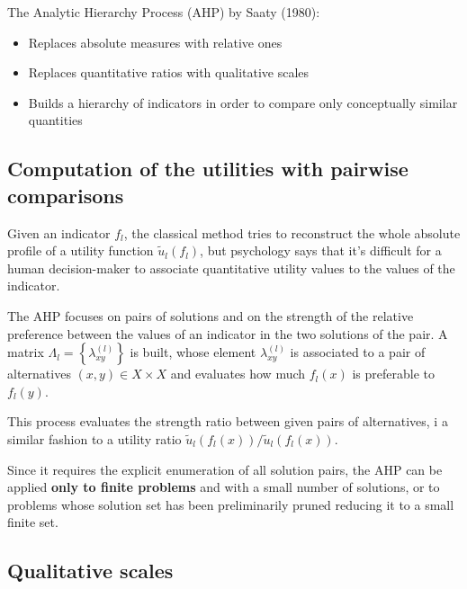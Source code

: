 The Analytic Hierarchy Process (AHP) by Saaty (1980): 
\begin{itemize}
	\item Replaces absolute measures with relative ones
	
	\item Replaces quantitative ratios with qualitative scales 
	
	\item Builds a hierarchy of indicators in order to compare only conceptually similar quantities
\end{itemize}

\subsection{Computation of the utilities with pairwise comparisons}

Given an indicator $f_l$, the classical method tries to reconstruct the whole absolute profile of a utility function $\tilde u_l (f_l)$, but psychology says that it's difficult for a human decision-maker to associate quantitative utility values to the values of the indicator.

The AHP focuses on pairs of solutions and on the strength of the relative preference between the values of an indicator in the two solutions of the pair. A matrix $\Lambda_l = \left\{\lambda_{xy}^{(l)}\right\}$ is built, whose element $\lambda_{xy}^{(l)}$ is associated to a pair of alternatives $(x,y) \in X \times X$ and evaluates how much $f_l (x)$ is preferable to $f_l (y)$.

This process evaluates the strength ratio between given pairs of alternatives, i a similar fashion to a utility ratio $\tilde u_l (f_l (x)) / \tilde u_l (f_l (x))$.

Since it requires the explicit enumeration of all solution pairs, the AHP can be applied \textbf{only to finite problems} and with a small number of solutions, or to problems whose solution set has been preliminarily pruned reducing it to a small finite set.

\subsection{Qualitative scales}

